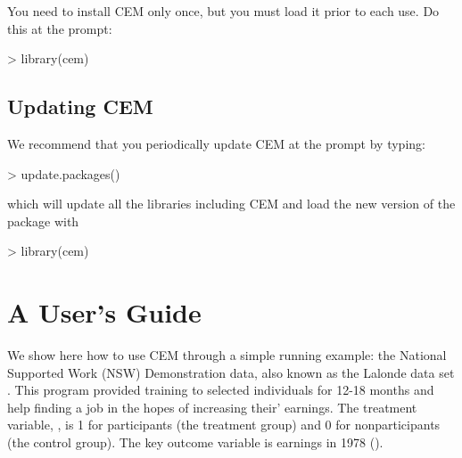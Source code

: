 \documentclass[article]{jss}
\begin{document}
You need to install CEM only once, but you must load it prior to each
use.  Do this at the  prompt:
\begin{Schunk}
\begin{Sinput}
> library(cem)
\end{Sinput}
\end{Schunk}

\subsection{Updating CEM}

We recommend that you periodically update CEM at the  prompt by
typing:
\begin{Schunk}
\begin{Sinput}
> update.packages()
\end{Sinput}
\end{Schunk}
which will update all the libraries including CEM
and load the new version of the package with
\begin{Schunk}
\begin{Sinput}
> library(cem)
\end{Sinput}
\end{Schunk}


\section{A User's Guide}

We show here how to use CEM through a simple running example: the
National Supported Work (NSW) Demonstration data, also known as the
Lalonde data set \citep{Lalonde86}.  This program provided training to
selected individuals for 12-18 months and help finding a job in the
hopes of increasing their' earnings.  The treatment variable,
, is 1 for participants (the treatment group) and 0 for
nonparticipants (the control group).  The key outcome variable is
earnings in 1978 ().  
\end{document}
